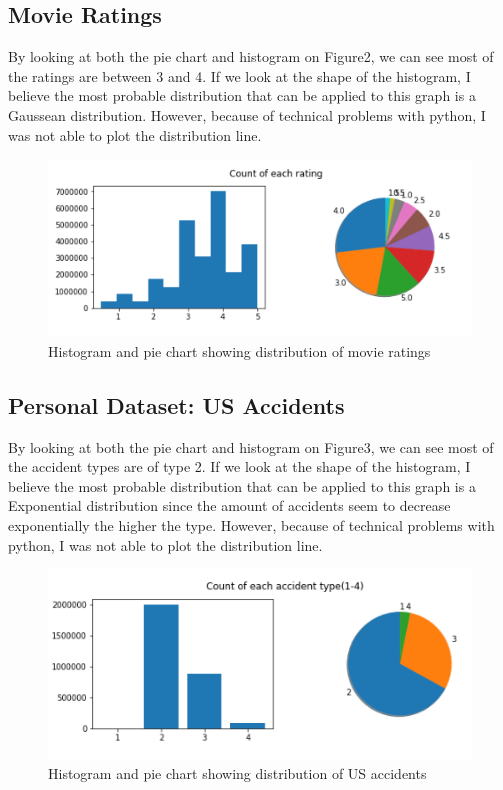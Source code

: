 \documentclass{article}
\begin{document}
\subsection{Movie Ratings}
By looking at both the pie chart and histogram on Figure2, we can see most of the ratings are between 3 and 4. If we look at the shape of the histogram, I believe the most probable distribution that can be applied to this graph is a Gaussean distribution. However, because of technical problems with python, I was not able to plot the distribution line.
\begin{figure}[H]
	\centering
	\includegraphics{movie rating}
	\caption{Histogram and pie chart showing distribution of movie ratings}
\end{figure}


\subsection{Personal Dataset: US Accidents}
By looking at both the pie chart and histogram on Figure3, we can see most of the accident types are of type 2. If we look at the shape of the histogram, I believe the most probable distribution that can be applied to this graph is a Exponential distribution since the amount of accidents seem to decrease exponentially the higher the type. However, because of technical problems with python, I was not able to plot the distribution line.
\begin{figure}[H]
	\centering
	\includegraphics{accident}
	\caption{Histogram and pie chart showing distribution of US accidents}
\end{figure}
\end{document}
